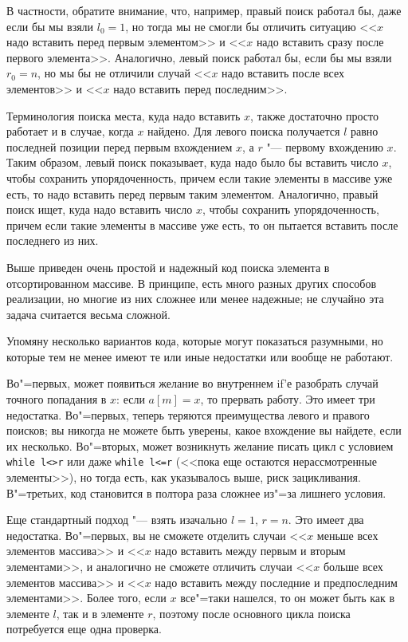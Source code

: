 \documentclass[a4paper,10pt]{problems}
\begin{document}
В частности, обратите внимание, что, например, правый поиск работал бы, даже если бы мы взяли $l_0=1$, 
но тогда мы не смогли бы отличить ситуацию <<$x$ надо вставить перед первым элементом>> 
и <<$x$ надо вставить сразу после первого элемента>>.
Аналогично, левый поиск работал бы, если бы мы взяли $r_0=n$, но мы бы не отличили 
случай <<$x$ надо вставить после всех элементов>> и <<$x$ надо вставить перед последним>>.

Терминология поиска места, куда надо вставить $x$, также достаточно просто
работает и в случае, когда $x$ найдено.
Для левого поиска получается $l$ равно последней позиции перед первым вхождением $x$,
а $r$ "--- первому вхождению $x$. 
Таким образом, левый поиск показывает, куда надо было бы вставить число $x$,
чтобы сохранить упорядоченность, причем если такие элементы в массиве уже есть,
то надо вставить перед первым таким элементом.
Аналогично, правый поиск ищет, куда надо вставить число $x$, чтобы сохранить упорядоченность,
причем если такие элементы в массиве уже есть, то он пытается вставить после последнего из них.

Выше приведен очень простой и надежный код поиска элемента в отсортированном массиве.
В принципе, есть много разных других способов реализации, но многие из них сложнее
или менее надежные; не случайно эта задача считается весьма сложной.

Упомяну несколько вариантов кода, которые могут показаться разумными, но которые тем не менее 
имеют те или иные недостатки или вообще не работают.

Во"=первых, может появиться желание во внутреннем if'е разобрать случай точного попадания в $x$:
если $a[m]=x$, то прервать работу. Это имеет три недостатка. 
Во"=первых, теперь теряются преимущества левого и правого поисков; вы никогда не можете
быть уверены, какое вхождение вы найдете, если их несколько.
Во"=вторых, может возникнуть желание писать цикл с условием \verb`while l<>r` или даже
\verb`while l<=r` (<<пока еще остаются нерассмотренные элементы>>), 
но тогда есть, как указывалось выше, риск зацикливания.
В"=третьих, код становится в полтора раза сложнее из"=за лишнего условия.

Еще стандартный подход "--- взять изачально $l=1$, $r=n$. Это имеет два недостатка. 
Во"=первых, вы не сможете отделить случаи <<$x$ меньше всех элементов массива>> и 
<<$x$ надо вставить между первым и вторым элементами>>, 
и аналогично не сможете отличить случаи <<$x$ больше всех элементов массива>> и 
<<$x$ надо вставить между последние и предпоследним элементами>>.
Более того, если $x$ все"=таки нашелся, то он может быть как в элементе $l$,
так и в элементе $r$, поэтому после основного цикла поиска потребуется еще одна проверка.
\end{document}
